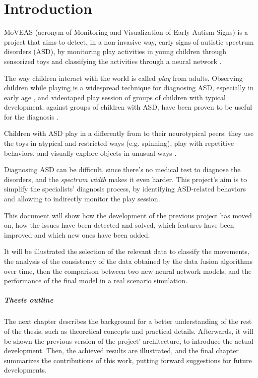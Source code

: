 \chapter{Introduction}
MoVEAS (acronym of Monitoring and Visualization of Early Autism Signs) is a project that aims to detect, in a non-invasive way, early signs of autistic spectrum disorders (ASD), by monitoring play activities in young children through sensorized toys and classifying the activities through a neural network \cite{Bon20, Lan19}.
\bigbreak

The way children interact with the world is called \textit{play} from adults. Observing children while playing is a widespread technique for diagnosing ASD, especially in early age \cite{Ozo08}, and videotaped play session of groups of children with typical development, against groups of children with ASD, have been proven to be useful for the diagnosis \cite{Bar05, Ozo08, Wet10}.

Children with ASD play in a differently from to their neurotypical peers: they use the toys in atypical and restricted ways (e.g. spinning), play with repetitive behaviors, and visually explore objects in unusual ways \cite{Bru07, Ozo08}.

Diagnosing ASD can be difficult, since there's no medical test to diagnose the disorders, and the \textit{spectrum width} makes it even harder. This project's aim is to simplify the specialists' diagnosis process, by identifying ASD-related behaviors and allowing to indirectly monitor the play session.
\bigbreak

This document will show how the development of the previous project has moved on, how the issues have been detected and solved, which features have been improved and which new ones have been added.

It will be illustrated the selection of the relevant data to classify the movements, the analysis of the consistency of the data obtained by the data fusion algorithms over time, then the comparison between two new neural network models, and the performance of the final model in a real scenario simulation.
\bigbreak

\paragraph{Thesis outline}
The next chapter describes the background for a better understanding of the rest of the thesis, such as theoretical concepts and practical details. Afterwards, it will be shown the previous version of the project' architecture, to introduce the actual development. Then, the achieved results are illustrated, and the final chapter summarizes the contributions of this work, putting forward suggestions for future developments.

